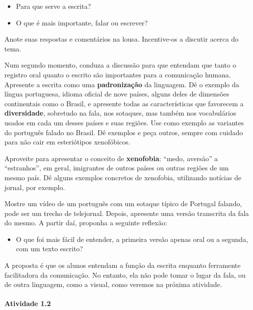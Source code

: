 \documentclass[11pt]{extarticle}
\begin{document}
\begin{itemize}
\item Para que serve a escrita?
\item O que é mais importante, falar ou escrever? 
\end{itemize}

Anote suas respostas e comentários na lousa. Incentive-os a discutir acerca do tema. 

Num segundo momento, conduza a discussão para que entendam que tanto o registro oral 
quanto o escrito são importantes para a comunicação humana. Apresente a escrita
como uma \textbf{padronização} da linguagem. Dê o exemplo da língua portuguesa,
idioma oficial de nove países, alguns deles de dimensões continentais como o Brasil, e apresente
todas as características que favorecem a \textbf{diversidade}, sobretudo na fala,
nos sotaques, mas também nos vocabulários usados em cada um desses países e suas regiões. Use como exemplo as variantes do português falado no Brasil.
Dê exemplos e peça outros, sempre com cuidado para não cair em esteriótipos xenofóbicos. 

Aproveite para apresentar o conceito de \textbf{xenofobia}: ``medo, aversão'' a ``estranhos'', em geral, imigrantes
de outros países ou outras regiões de um mesmo país. Dê alguns exemplos concretos de 
xenofobia, utilizando notícias de jornal, por exemplo. 

Mostre um vídeo de um português com um sotaque típico de Portugal falando, pode ser um trecho de 
telejornal. Depois, apresente uma versão transcrita da fala do mesmo. 
A partir daí, proponha a seguinte reflexão:

\begin{itemize}
\item O que foi mais fácil de entender, a primeira versão apenas oral ou a segunda,
com um texto escrito? 
\end{itemize}

A proposta é que os alunos entendam a função da escrita enquanto ferramente facilitadora
da comunicação. No entanto, ela não pode tomar o lugar da fala, ou de outra linguagem,
como a visual, como veremos na próxima atividade.

\paragraph{Atividade 1.2}
\end{document}

